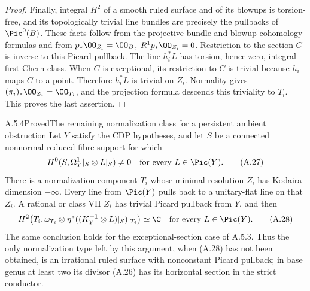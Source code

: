 \begin{proof}
Finally, integral $H^2$ of a smooth ruled surface and of its blowups is torsion-free, and its topologically trivial line bundles are precisely the pullbacks of $\Pic^0(B)$. These facts follow from the projective-bundle and blowup cohomology formulas and from $p_*\OO_{Z_i}=\OO_B$, $R^1p_*\OO_{Z_i}=0$. Restriction to the section $C$ is inverse to this Picard pullback. The line $h_i^*L$ has torsion, hence zero, integral first Chern class. When $C$ is exceptional, its restriction to $C$ is trivial because $h_i$ maps $C$ to a point. Therefore $h_i^*L$ is trivial on $Z_i$. Normality gives $(\pi_i)_*\OO_{Z_i}=\OO_{T_i}$, and the projection formula descends this triviality to $T_i$. This proves the last assertion.
\end{proof}

\begin{statement}{A.5.4}{Proved}{The remaining normalization class for a persistent ambient obstruction}
Let $Y$ satisfy the CDP hypotheses, and let $S$ be a connected nonnormal reduced fibre support for which
\[
 H^0(S,\Omega_Y^1|_S\otimes L|_S)\ne0
 \quad\hbox{for every }L\in\Pic(Y).
 \tag{A.27}
\]
There is a normalization component $T_i$ whose minimal resolution $Z_i$ has Kodaira dimension $-\infty$. Every line from $\Pic(Y)$ pulls back to a unitary-flat line on that $Z_i$. A rational or class VII $Z_i$ has trivial Picard pullback from $Y$, and then
\[
 H^2\!\left(T_i,\omega_{T_i}\otimes
             \eta^*((K_Y^{-1}\otimes L)|_S)|_{T_i}\right)\simeq\C
 \quad\hbox{for every }L\in\Pic(Y).
 \tag{A.28}
\]
The same conclusion holds for the exceptional-section case of A.5.3. Thus the only normalization type left by this argument, when (A.28) has not been obtained, is an irrational ruled surface with nonconstant Picard pullback; in base genus at least two its divisor (A.26) has its horizontal section in the strict conductor.
\end{statement}

